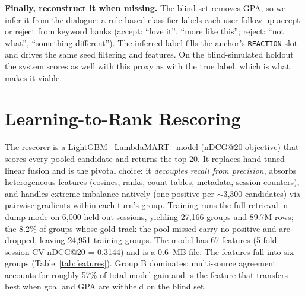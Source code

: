 \documentclass[sigconf]{acmart}
\begin{document}
\textbf{Finally, reconstruct it when missing.} The blind set removes GPA, so we infer
it from the dialogue: a rule-based classifier labels each user follow-up accept or
reject from keyword banks (accept: ``love it'', ``more like this''; reject: ``not
what'', ``something different''). The inferred label fills the anchor's \texttt{REACTION}
slot and drives the same seed filtering and features. On the blind-simulated
holdout the system scores as well with this proxy as with the true label, which is
what makes it viable.

\section{Learning-to-Rank Rescoring}

The rescorer is a LightGBM~\cite{lightgbm} LambdaMART~\cite{lambdamart} model (nDCG@20 objective) that scores every
pooled candidate and returns the top 20. It replaces hand-tuned linear fusion and
is the pivotal choice: it \emph{decouples recall from precision}, absorbs heterogeneous
features (cosines, ranks, count tables, metadata, session counters), and handles
extreme imbalance natively (one positive per $\sim$3,300 candidates) via pairwise
gradients within each turn's group. Training runs the full retrieval in dump mode
on 6,000 held-out sessions, yielding 27,166 groups and 89.7M rows; the 8.2\% of
groups whose gold track the pool missed carry no positive and are dropped,
leaving 24,951 training groups. The model has 67 features (5-fold session CV
nDCG@20 = 0.3144) and is a 0.6~MB file. The features fall into six groups (Table~\ref{tab:features}). Group B dominates:
multi-source agreement accounts for roughly 57\% of total model gain and is the
feature that transfers best when goal and GPA are withheld on the blind set.

\end{document}
